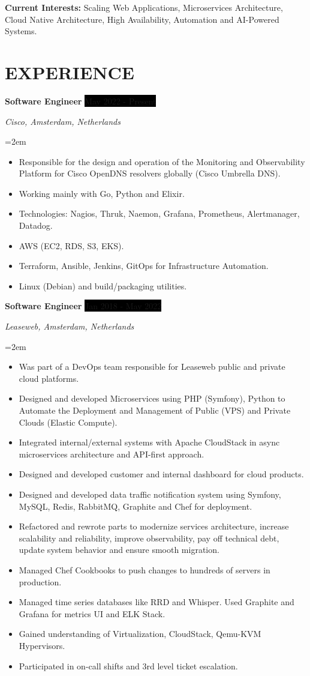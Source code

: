\documentclass[paper=a4,fontsize=11pt]{scrartcl} %
\newcommand{\sepspace}{\vspace*{1em}}		%
\newcommand{\NewPart}[1]{\section*{\uppercase{#1}}}
\newcommand{\EducationEntry}[4]{
		\noindent \textbf{#1} \hfill      %
		\colorbox{Black}{%
			\parbox{6em}{%
			\hfill\color{White}#2}} \par  %
		\noindent \textit{#3} \par        %
		\noindent\hangindent=2em\hangafter=0 \small #4 %
		\normalsize \par}
\newcommand{\WorkEntry}[4]{				  %
		\noindent \textbf{#1} \hfill      %
		\colorbox{Black}{\color{White}#2} \par  %
		\noindent \textit{#3} \par              %
		\noindent\hangindent=2em\hangafter=0 \small #4 %
		\normalsize \par}
\begin{document}
\sepspace

\textbf{Current Interests:} Scaling Web Applications, Microservices Architecture, Cloud Native Architecture, High Availability, Automation and AI-Powered Systems.

\sepspace


\NewPart{Experience}{}

\WorkEntry{Software Engineer}{May 2022 - Present}{Cisco, Amsterdam, Netherlands}{\begin{itemize}
\item Responsible for the design and operation of the Monitoring and Observability Platform for Cisco OpenDNS resolvers globally (Cisco Umbrella DNS).
\item Working mainly with Go, Python and Elixir.
\item Technologies: Nagios, Thruk, Naemon, Grafana, Prometheus, Alertmanager, Datadog.
\item AWS (EC2, RDS, S3, EKS).
\item Terraform, Ansible, Jenkins, GitOps for Infrastructure Automation.
\item Linux (Debian) and build/packaging utilities.
\end{itemize}}
\sepspace

\WorkEntry{Software Engineer}{Jan 2018 - May 2022}{Leaseweb, Amsterdam, Netherlands}{\begin{itemize}
\item Was part of a DevOps team responsible for Leaseweb public and private cloud platforms.
\item Designed and developed Microservices using PHP (Symfony), Python to Automate the Deployment and Management of Public (VPS) and Private Clouds (Elastic Compute).
\item Integrated internal/external systems with Apache CloudStack in async microservices architecture and API-first approach.
\item Designed and developed customer and internal dashboard for cloud products.
\item Designed and developed data traffic notification system using Symfony, MySQL, Redis, RabbitMQ, Graphite and Chef for deployment.
\item Refactored and rewrote parts to modernize services architecture, increase scalability and reliability, improve observability, pay off technical debt, update system behavior and ensure smooth migration.
\item Managed Chef Cookbooks to push changes to hundreds of servers in production.
\item Managed time series databases like RRD and Whisper. Used Graphite and Grafana for metrics UI and ELK Stack.
\item Gained understanding of Virtualization, CloudStack, Qemu-KVM Hypervisors.
\item Participated in on-call shifts and 3rd level ticket escalation.
\end{itemize}}
\sepspace
\end{document}
